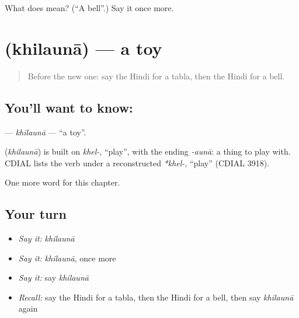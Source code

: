 \begin{tcolorbox}[breakable,colback=teal!4,colframe=teal!35!black,title={Before you move on}]
What does  mean? (\textquotedblleft{}A bell\textquotedblright{}.) Say it once more.
\end{tcolorbox}
\section[\texorpdfstring{\hi{खिलौना} (khilaunā)}{खिलौना (khilaunā)}]{ (khilaunā) — a toy}

\label{lesson:HI-C264-khilauna}



\begin{quote}
Before the new one: say the Hindi for a tabla, then the Hindi for a bell.
\end{quote}

\subsection*{You'll want to know: }
\textbf{} — \emph{khilaunā} — \textquotedblleft{}a toy\textquotedblright{}.

\begin{cousinweb}
\textbf{} (\emph{khilaunā}) is built on \emph{khel-}, \textquotedblleft{}play\textquotedblright{}, with the ending \emph{-aunā}: a thing to play with. CDIAL lists the verb under a reconstructed \emph{*khel-}, \textquotedblleft{}play\textquotedblright{} (CDIAL 3918).
\end{cousinweb}

\begin{grammarlens}[title={What you've built}]
One more word for this chapter.
\end{grammarlens}

\subsection*{Your turn}
\begin{itemize}
\raggedright
  \item \emph{Say it:} \emph{khilaunā}
  \item \emph{Say it:} \emph{khilaunā}, once more
  \item \emph{Say it:} say \emph{khilaunā}
  \item \emph{Recall:} say the Hindi for a tabla, then the Hindi for a bell, then say \emph{khilaunā} again
\end{itemize}

